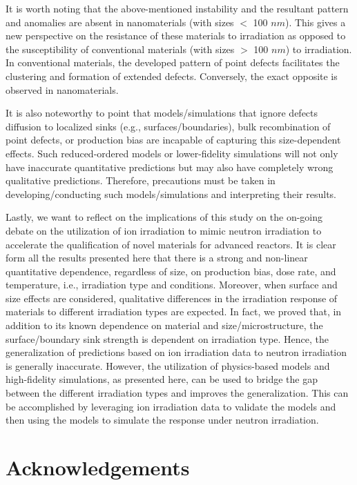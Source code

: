 \documentclass[utf8]{frontiersSCNS} %
\begin{document}
It is worth noting that the above-mentioned instability and the resultant pattern and anomalies are absent in nanomaterials (with sizes $<$ 100 $nm$). This gives a new perspective on the resistance of these materials to irradiation as opposed to the susceptibility of conventional materials (with sizes $>$ 100 $nm$) to irradiation. In conventional materials, the developed pattern of point defects facilitates the clustering and formation of extended defects. Conversely, the exact opposite is observed in nanomaterials.

It is also noteworthy to point that models/simulations that ignore defects diffusion to localized sinks (e.g., surfaces/boundaries), bulk recombination of point defects, or production bias are incapable of capturing this size-dependent effects. Such reduced-ordered models or lower-fidelity simulations will not only have inaccurate quantitative predictions but may also have completely wrong qualitative predictions. Therefore, precautions must be taken in developing/conducting such models/simulations and interpreting their results. 

Lastly, we want to reflect on the implications of this study on the on-going debate on the utilization of ion irradiation to mimic neutron irradiation to accelerate the qualification of novel materials for advanced reactors. It is clear form all the results presented here that there is a strong and non-linear quantitative dependence, regardless of size, on production bias, dose rate, and temperature, i.e., irradiation type and conditions. Moreover, when surface and size effects are considered, qualitative differences in the irradiation response of materials to different irradiation types are expected. In fact, we proved that, in addition to its known dependence on material and size/microstructure, the surface/boundary sink strength is dependent on irradiation type. Hence, the generalization of predictions based on ion irradiation data to neutron irradiation is generally inaccurate. However, the utilization of physics-based models and high-fidelity simulations, as presented here, can be used to bridge the gap between the different irradiation types and improves the generalization. This can be accomplished by leveraging ion irradiation data to validate the models and then using the models to simulate the response under neutron irradiation.         

\section*{Acknowledgements}
 
\end{document}
